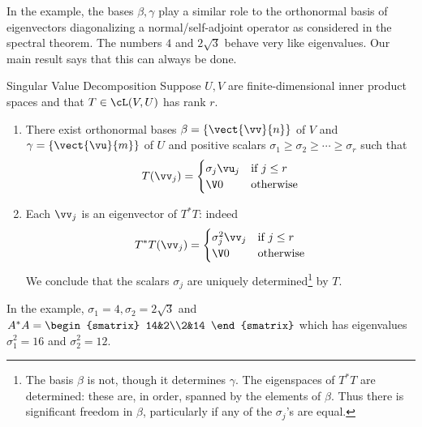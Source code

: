 In the example, the bases $\beta,\gamma$ play a similar role to the orthonormal basis of eigenvectors diagonalizing a normal/self-adjoint operator as considered in the spectral theorem. The numbers $4$ and $2\sqrt 3$ behave very like eigenvalues. Our main result says that this can always be done.

\begin{thm}{Singular Value Decomposition}{}
Suppose $U,V$ are finite-dimensional inner product spaces and that $T\in\cL(V,U)$ has rank $r$.
\begin{enumerate}
  \item There exist orthonormal bases $\beta=\{\vect{\vv}{n}\}$ of $V$ and $\gamma=\{\vect{\vu}{m}\}$ of $U$ and positive scalars $\sigma_1\ge\sigma_2\ge\cdots\ge \sigma_r$ such that
  \[T(\vv_j)=\begin{cases}
  \sigma_j\vu_j&\text{if }j\le r\\
  \V0&\text{otherwise}
  \end{cases}\]
  \item Each $\vv_j$ is an eigenvector of $T^*T$: indeed
  \[T^*T(\vv_j)=\begin{cases}
  \sigma_j^2\vv_j&\text{if }j\le r\\
  \V0&\text{otherwise}
  \end{cases}\]
  We conclude that the scalars $\sigma_j$ are uniquely determined\footnote{The basis $\beta$ is not, though it determines $\gamma$. The eigenspaces of $T^*T$ are determined: these are, in order, spanned by the elements of $\beta$. Thus there is significant freedom in $\beta$, particularly if any of the $\sigma_j$'s are equal.} by $T$.
\end{enumerate}
\end{thm}

In the example, $\sigma_1=4,\sigma_2=2\sqrt 3$ and $A^*A=\begin{smatrix}
14&2\\2&14
\end{smatrix}$ which has eigenvalues $\sigma_1^2=16$ and $\sigma_2^2=12$.

